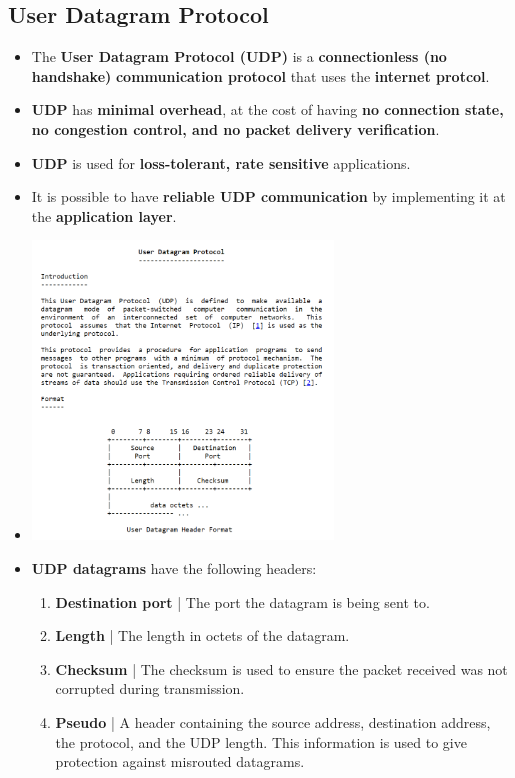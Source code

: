 \documentclass{article}
\begin{document}
    \subsection*{User Datagram Protocol}
    \begin{itemize}
        \item The \textbf{User Datagram Protocol (UDP)} is a \textbf{connectionless (no handshake)} \textbf{communication protocol} that uses the \textbf{internet protcol}.
        \item \textbf{UDP} has \textbf{minimal overhead}, at the cost of having \textbf{no connection state, no congestion control, and no packet delivery verification}.
        \item \textbf{UDP} is used for \textbf{loss-tolerant, rate sensitive} applications.
        \item It is possible to have \textbf{reliable UDP communication} by implementing it at the \textbf{application layer}.
        \item[] \begin{center}
                    \includegraphics[height=300px]{images/UDP.PNG}
                \end{center}
        \item \textbf{UDP datagrams} have the following headers:
        \begin{enumerate}
            \item \textbf{Destination port} | The port the datagram is being sent to.
            \item \textbf{Length} | The length in octets of the datagram.
            \item \textbf{Checksum} | The checksum is used to ensure the packet received was not corrupted during transmission.
            \item \textbf{Pseudo} | A header containing the source address, destination address, the protocol, and the UDP length. This information is used to give protection against misrouted datagrams.

\end{enumerate}
\end{itemize}
\end{document}
